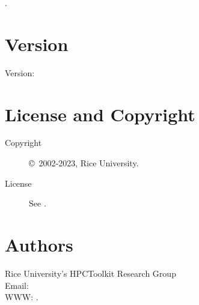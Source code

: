 \documentclass[english]{article}
\begin{document}
.

\section{Version}

Version: \Version

\section{License and Copyright}

\begin{description}
\item[Copyright] \copyright\ 2002-2023, Rice University.
\item[License] See .
\end{description}

\section{Authors}

\noindent
Rice University's HPCToolkit Research Group \\
Email:  \\
WWW: .

\LatexManEnd
\end{document}
